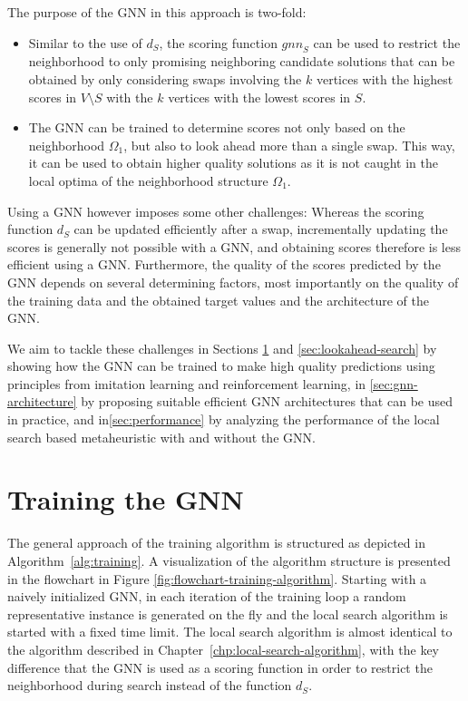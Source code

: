 \documentclass[draft,final]{vutinfth} %
\begin{document}
The purpose of the GNN in this approach is two-fold: 
\begin{itemize}
    \item Similar to the use of $d_S$, the scoring function $\mathit{gnn}_S$ can be used to restrict the neighborhood to only promising neighboring candidate solutions that can be obtained by only considering swaps involving the $k$ vertices with the highest scores in $V \setminus S$ with the $k$ vertices with the lowest scores in $S$. 
    \item The GNN can be trained to determine scores not only based on the neighborhood $\Omega_1$, but also to look ahead more than a single swap. This way, it can be used to obtain higher quality solutions as it is not caught in the local optima of the neighborhood structure $\Omega_1$.
\end{itemize}

Using a GNN however imposes some other challenges: 
Whereas the scoring function $d_S$ can be updated efficiently after a swap, incrementally updating the scores is generally not possible with a GNN, and obtaining scores therefore is less efficient using a GNN. 
Furthermore, the quality of the scores predicted by the GNN depends on several determining factors, most importantly on the quality of the training data and the obtained target values and the architecture of the GNN. 

We aim to tackle these challenges in Sections \ref{sec:gnn-training} and \ref{sec:lookahead-search} by showing how the GNN can be trained to make high quality predictions using principles from imitation learning and reinforcement learning, in \ref{sec:gnn-architecture} by proposing suitable efficient GNN architectures that can be used in practice, and in\ref{sec:performance} by analyzing the performance of the local search based metaheuristic with and without the GNN. 

\section{Training the GNN}\label{sec:gnn-training}

The general approach of the training algorithm is structured as depicted in Algorithm~\ref{alg:training}. A visualization of the algorithm structure is presented in the flowchart in Figure \ref{fig:flowchart-training-algorithm}. 
Starting with a naively initialized GNN, in each iteration of the training loop a random representative instance is generated on the fly and the local search algorithm is started with a fixed time limit. The local search algorithm is almost identical to the algorithm described in Chapter~\ref{chp:local-search-algorithm}, with the key difference that the GNN is used as a scoring function in order to restrict the neighborhood during search instead of the function $d_S$.  
\end{document}

